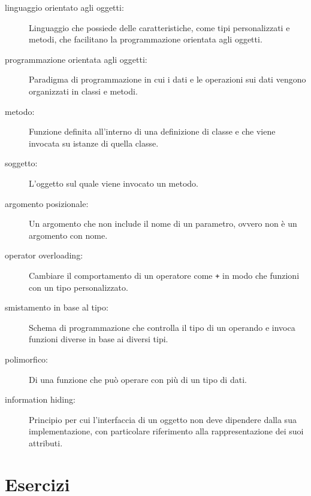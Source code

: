 \documentclass[10pt]{book}
\begin{document}
\begin{description}

\item[linguaggio orientato agli oggetti:] Linguaggio che possiede delle caratteristiche, come tipi personalizzati e metodi, che facilitano la programmazione orientata agli oggetti. 

\item[programmazione orientata agli oggetti:] Paradigma di programmazione in cui i dati e le operazioni sui dati vengono organizzati in classi e metodi.

\item[metodo:] Funzione definita all'interno di una definizione di classe e che viene invocata su istanze di quella classe.

\item[soggetto:] L'oggetto sul quale viene invocato un metodo.

\item[argomento posizionale:] Un argomento che non include il nome di un
parametro, ovvero non è un argomento con nome.

\item[operator overloading:] Cambiare il comportamento di un operatore come
{\tt +} in modo che funzioni con un tipo personalizzato.

\item[smistamento in base al tipo:] Schema di programmazione che controlla il tipo di un operando e invoca funzioni diverse in base ai diversi tipi.

\item[polimorfico:] Di una funzione che può operare con più di un tipo di dati.

\item[information hiding:] Principio per cui l'interfaccia di un oggetto non deve dipendere dalla sua implementazione, con particolare riferimento alla rappresentazione dei suoi attributi.


\end{description}

\section{Esercizi}
\end{document}
